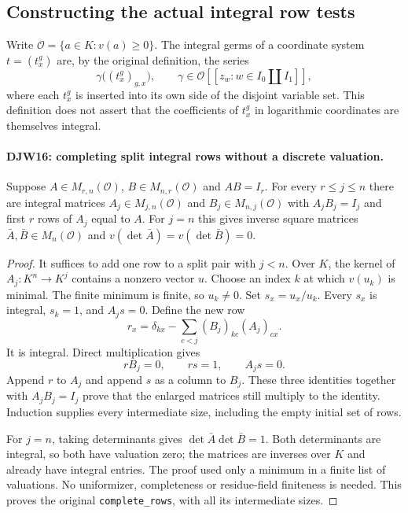\subsection{Constructing the actual integral row tests}

Write $\mathcal O=\{a\in K:v(a)\ge0\}$.
The integral germs of a coordinate system $t=(t^g_x)$ are, by
the original definition, the series
\begin{equation}
 \gamma\bigl((t^g_x)_{g,x}\bigr),\qquad
       \gamma\in\mathcal O[[z_w:w\in I_0\amalg I_1]],
 \label{djw:intgerm}
\end{equation}
where each $t^g_x$ is inserted into its own side of the disjoint
variable set.  This definition does not assert that the coefficients
of $t^g_x$ in logarithmic coordinates are themselves integral.

\paragraph{DJW16: completing split integral rows without a discrete valuation.}
\label{claim:DJW16}
Suppose $A\in M_{r,n}(\mathcal O)$,
$B\in M_{n,r}(\mathcal O)$ and $AB=I_r$.
For every $r\le j\le n$ there are integral matrices
$A_j\in M_{j,n}(\mathcal O)$ and $B_j\in M_{n,j}(\mathcal O)$
with $A_jB_j=I_j$ and first $r$ rows of $A_j$ equal to $A$.
For $j=n$ this gives inverse square matrices
$\bar A,\bar B\in M_n(\mathcal O)$ and
$v(\det\bar A)=v(\det\bar B)=0$.

\begin{proof}
It suffices to add one row to a split pair with $j<n$.
Over $K$, the kernel of $A_j:K^n\to K^j$ contains a nonzero
vector $u$.  Choose an index $k$ at which $v(u_k)$ is minimal.
The finite minimum is finite, so $u_k\ne0$.
Set $s_x=u_x/u_k$.  Every $s_x$ is integral, $s_k=1$, and
$A_js=0$.  Define the new row
\[
 r_x=\delta_{kx}-\sum_{c<j}(B_j)_{kc}(A_j)_{cx}.
\]
It is integral.  Direct multiplication gives
\[
 rB_j=0,\qquad rs=1,\qquad A_js=0.
\]
Append $r$ to $A_j$ and append $s$ as a column to $B_j$.
These three identities together with $A_jB_j=I_j$ prove that
the enlarged matrices still multiply to the identity.
Induction supplies every intermediate size, including the empty
initial set of rows.

For $j=n$, taking determinants gives
$\det\bar A\det\bar B=1$.
Both determinants are integral, so both have valuation zero;
the matrices are inverses over $K$ and already have integral
entries.  The proof used only a minimum in a finite list of
valuations.  No uniformizer, completeness or residue-field
finiteness is needed.  This proves the original
\texttt{complete\_rows}, with all its intermediate sizes.
\end{proof}

